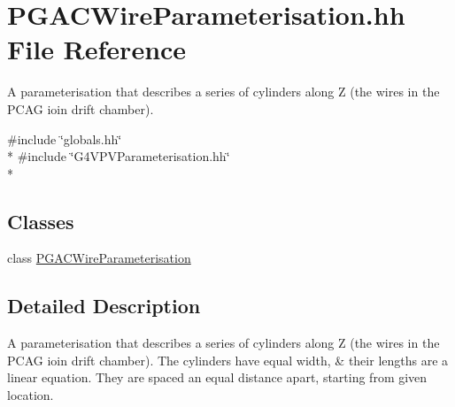 \hypertarget{PGACWireParameterisation_8hh}{\section{P\-G\-A\-C\-Wire\-Parameterisation.\-hh File Reference}
\label{PGACWireParameterisation_8hh}
}


A parameterisation that describes a series of cylinders along Z (the wires in the P\-C\-A\-G ioin drift chamber).  


{\ttfamily \#include \char`\"{}globals.\-hh\char`\"{}}\\*
{\ttfamily \#include \char`\"{}G4\-V\-P\-V\-Parameterisation.\-hh\char`\"{}}\\*
\subsection*{Classes}
\begin{DoxyCompactItemize}
\item 
class \hyperlink{classPGACWireParameterisation}{P\-G\-A\-C\-Wire\-Parameterisation}
\end{DoxyCompactItemize}


\subsection{Detailed Description}
A parameterisation that describes a series of cylinders along Z (the wires in the P\-C\-A\-G ioin drift chamber). The cylinders have equal width, \& their lengths are a linear equation. They are spaced an equal distance apart, starting from given location. 